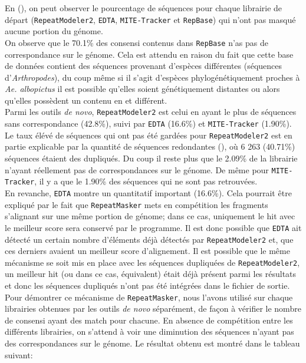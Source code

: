 \documentclass[10pt]{article}
\begin{document}
En \figureautorefname{ \ref{fig:nb_cons_by_tool}} (\linkautorefname{\ref{link8}}), on peut observer le pourcentage de séquences pour chaque librairie de départ (\texttt{RepeatModeler2}, \texttt{EDTA}, \texttt{MITE-Tracker} et \texttt{RepBase}) qui n'ont pas masqué aucune portion du génome. \\
On observe que le 70.1\% des consensi contenus dans \texttt{RepBase} n'as pas de correspondance sur le génome. Cela est attendu en raison du fait que cette base de données contient des séquences provenant d'espèces différentes (séquences d'\textit{Arthropodes}), du coup même si il s'agit d'espèces phylogénétiquement proches à \textit{Ae. albopictus} il est possible qu'elles soient génétiquement distantes ou alors qu'elles possèdent un contenu en \acrlong{et} différent. \\
Parmi les outils \textit{de novo}, \texttt{RepeatModeler2} est celui en ayant le plus de séquences sans correspondance (42.8\%), suivi par \texttt{EDTA} (16.6\%) et \texttt{MITE-Tracker} (1.90\%). Le taux élévé de séquences qui ont pas été gardées pour \texttt{RepeatModeler2} est en partie explicable par la quantité de séquences redondantes (\tableautorefname{ \ref{tab:redondant_consensi}}), où 6 263 (40.71\%) séquences étaient des dupliqués. Du coup il reste plus que le 2.09\% de la librairie n'ayant réellement pas de correspondances sur le génome. De même pour \texttt{MITE-Tracker}, il y a que le 1.90\% des séquences qui ne sont pas retrouvées. \\
En revanche, \texttt{EDTA} montre un quantitatif important (16.6\%). Cela pourrait être expliqué par le fait que \texttt{RepeatMasker} mets en \og compétition \fg{} les fragments s'alignant sur une même portion de génome; dans ce cas, uniquement le hit avec le meilleur score sera conservé par le programme. Il est donc possible que \texttt{EDTA} ait détecté un certain nombre d'éléments déjà détectés par \texttt{RepeatModeler2} et, que ces derniers avaient un meilleur score d'alignement. Il est possible que le même mécanisme se soit mis en place avec les séquences dupliquées de \texttt{RepeatModeler2}, un meilleur hit (ou dans ce cas, équivalent) était déjà présent parmi les résultats et donc les séquences dupliqués n'ont pas été intégrées dans le fichier de sortie.  \\
Pour démontrer ce mécanisme de \texttt{RepeatMasker}, nous l'avons utilisé sur chaque librairies obtenues par les outils \textit{de novo} séparément, de façon à vérifier le nombre de consensi ayant des match pour chacune. En absence de compétition entre les différents librairies, on s'attend à voir une diminution des séquences n'ayant pas des correspondances sur le génome. Le résultat obtenu est montré dans le tableau suivant: \\
\end{document}
